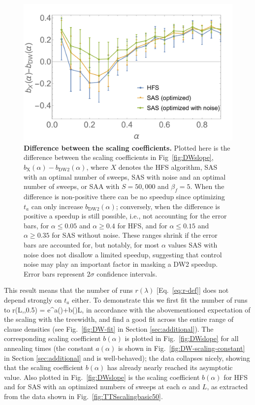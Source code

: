 \begin{figure}[t]
\begin{center}
\includegraphics[width=\columnwidth]{chapters/Planted/DifferenceSlopeDW-vs-HFS-vs-SAS-vs-SASnoisy.pdf}
\caption{\textbf{Difference between the scaling coefficients.} Plotted here is the difference between the scaling coefficients in Fig~\ref{fig:DWslope}, $b_{\textrm{X}}(\alpha) - b_{\textrm{DW2}}(\alpha)$, where $X$ denotes the HFS algorithm, SAS with an optimal number of sweeps, SAS with noise and an optimal number of sweeps, or SAA with $S=50,000$ and $\beta_f=5$. When the difference is non-positive there can be no speedup since optimizing $t_a$ can only increase $b_{\textrm{DW2}}(\alpha)$; conversely, when the difference is positive a speedup is still possible, i.e., not accounting for the error bars, for $\alpha\leq 0.05$ and $\alpha\geq 0.4$ for HFS, and for $\alpha \leq 0.15$ and $\alpha \geq 0.35$ for SAS without noise. These ranges shrink if the error bars are accounted for, but notably, for most $\alpha$ values SAS with noise does not disallow a limited speedup, suggesting that control noise may play an important factor in masking a DW2 speedup.  Error bars represent $2\sigma$ confidence intervals.}
\label{fig:DiffDWslope}
\end{center}
\end{figure}

This result means that the number of runs $r(\lambda)$ [Eq.~\eqref{eq:r-def}] does not depend strongly on $t_a$ either. To demonstrate this we first fit the number of runs to
\beq
r(L,\alpha,0.5) = e^{a(\alpha)+b(\alpha)L},
\label{eq:fit-exp-r}
\eeq
in accordance with the abovementioned expectation of the scaling with the treewidth, and find a good fit across the entire range of clause densities (see Fig.~\ref{fig:DW-fit} in Section \ref{sec:additional}). The corresponding scaling coefficient $b(\alpha)$ is plotted in Fig.~\ref{fig:DWslope} for all annealing times (the constant $a(\alpha)$ is shown in Fig.~\ref{fig:DW-scaling-constant} in Section \ref{sec:additional} and is well-behaved); the data collapses nicely, showing that the scaling coefficient $b(\alpha)$ has already nearly reached its asymptotic value. Also plotted in Fig.~\ref{fig:DWslope} is the scaling coefficient $b(\alpha)$ for HFS and for SAS with an optimized numbers of sweeps at each $\alpha$ and $L$, as extracted from the data shown in Fig.~\ref{fig:TTSscalingbasic50}.


